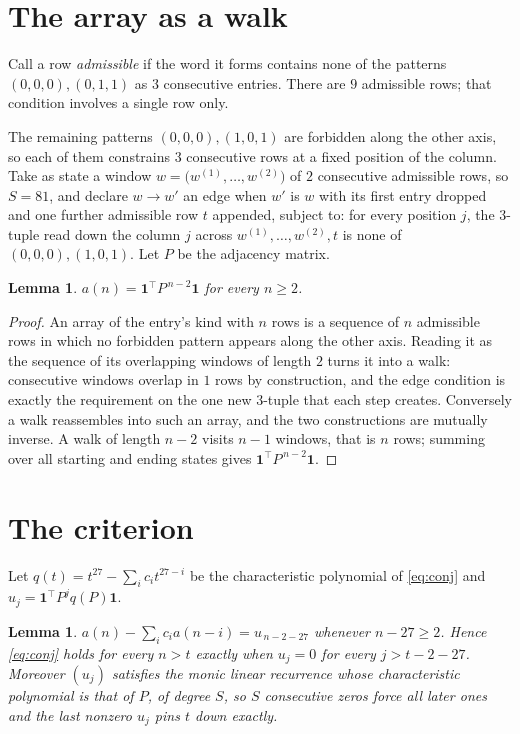 \documentclass[11pt,a4paper]{article}
\theoremstyle{plain}
\newtheorem{lemma}[theorem]{Lemma}
\theoremstyle{definition}
\begin{document}
\section{The array as a walk}

Call a row \emph{admissible} if the word it forms contains none of the patterns
$(0,0,0), (0,1,1)$ as $3$ consecutive entries. There are $9$ admissible rows; that condition
involves a single row only.

The remaining patterns $(0,0,0), (1,0,1)$ are forbidden along the other axis, so each of them
constrains $3$ consecutive rows at a fixed position of the column. Take as state a
window $w=\bigl(w^{(1)},\dots,w^{(2)}\bigr)$ of $2$ consecutive admissible
rows, so $S=81$, and declare $w\to w'$ an edge when $w'$ is $w$ with its first entry
dropped and one further admissible row $t$ appended, subject to: for every position
$j$, the $3$-tuple read down the column $j$ across $w^{(1)},\dots,w^{(2)},t$
is none of $(0,0,0), (1,0,1)$. Let $P$ be the adjacency matrix.

\begin{lemma}\label{lem:walk}
$a(n)=\mathbf{1}^{\!\top}P^{\,n-2}\mathbf{1}$ for every $n\ge2$.
\end{lemma}

\begin{proof}
An array of the entry's kind with $n$ rows is a sequence of $n$ admissible rows in
which no forbidden pattern appears along the other axis. Reading it as the sequence of its
overlapping windows of length $2$ turns it into a walk: consecutive windows overlap in
$1$ rows by construction, and the edge condition is exactly the requirement on the one
new $3$-tuple that each step creates. Conversely a walk reassembles into such an array,
and the two constructions are mutually inverse. A walk of length $n-2$ visits $n-1$
windows, that is $n$ rows; summing over all starting and ending states gives
$\mathbf{1}^{\!\top}P^{\,n-2}\mathbf{1}$.
\end{proof}

\section{The criterion}

Let $q(t)=t^{27}-\sum_i c_i t^{27-i}$ be the characteristic polynomial of
\eqref{eq:conj} and $u_j=\mathbf{1}^{\!\top}P^{j}q(P)\mathbf{1}$.

\begin{lemma}\label{lem:crit}
$a(n)-\sum_i c_i a(n-i)=u_{\,n-2-27}$ whenever $n-27\ge2$. Hence
\eqref{eq:conj} holds for every $n>t$ exactly when $u_j=0$ for every
$j>t-2-27$. Moreover $(u_j)$ satisfies the monic linear recurrence whose
characteristic polynomial is that of $P$, of degree $S$, so $S$ consecutive zeros force all
later ones and the last nonzero $u_j$ pins $t$ down exactly.
\end{lemma}
\end{document}
